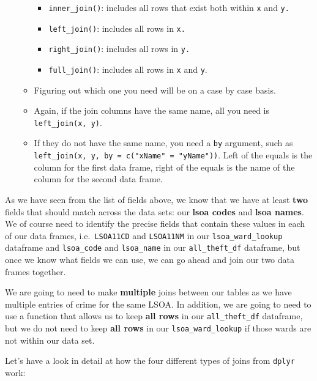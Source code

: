 \documentclass[
]{book}
\providecommand{\tightlist}{%
  \setlength{\itemsep}{0pt}\setlength{\parskip}{0pt}}
\begin{document}
\begin{itemize}
\begin{itemize}
    \begin{itemize}
    \tightlist
    \item
      \texttt{inner\_join()}: includes all rows that exist both within \texttt{x} and \texttt{y.}
    \item
      \texttt{left\_join()}: includes all rows in \texttt{x.}
    \item
      \texttt{right\_join()}: includes all rows in \texttt{y.}
    \item
      \texttt{full\_join()}: includes all rows in \texttt{x} and \texttt{y}.
    \end{itemize}
  \item
    Figuring out which one you need will be on a case by case basis.
  \item
    Again, if the join columns have the same name, all you need is \texttt{left\_join(x,\ y)}.
  \item
    If they do not have the same name, you need a \texttt{by} argument, such as \texttt{left\_join(x,\ y,\ by\ =\ c("xName"\ =\ "yName"))}. Left of the equals is the column for the first data frame, right of the equals is the name of the column for the second data frame.
  \end{itemize}
\end{itemize}

As we have seen from the list of fields above, we know that we have at least \textbf{two} fields that should match across the data sets: our \textbf{lsoa codes} and \textbf{lsoa names}. We of course need to identify the precise fields that contain these values in each of our data frames, i.e.~\texttt{LSOA11CD} and \texttt{LSOA11NM} in our \texttt{lsoa\_ward\_lookup} dataframe and \texttt{lsoa\_code} and \texttt{lsoa\_name} in our \texttt{all\_theft\_df} dataframe, but once we know what fields we can use, we can go ahead and join our two data frames together.

We are going to need to make \textbf{multiple} joins between our tables as we have multiple entries of crime for the same LSOA. In addition, we are going to need to use a function that allows us to keep \textbf{all rows} in our \texttt{all\_theft\_df} dataframe, but we do not need to keep \textbf{all rows} in our \texttt{lsoa\_ward\_lookup} if those wards are not within our data set.

Let's have a look in detail at how the four different types of joins from \texttt{dplyr} work:
\end{document}
